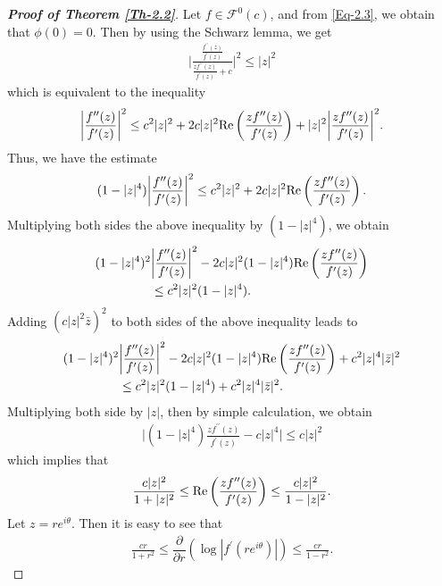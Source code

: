 \documentclass[a4paper,12pt]{amsart}
\theoremstyle{plain}
\theoremstyle{definition}
\theoremstyle{plain}
\begin{document}
\begin{proof}[\bf Proof of Theorem \ref{Th-2.2}]
	Let $f\in\mathcal{F}^0(c)$, and from \eqref{Eq-2.3}, we obtain that $\phi(0)=0$. Then  by using the Schwarz lemma, we get
	\begin{align*}
		\bigg|\frac{\frac{f^{\prime\prime}(z)}{f^{\prime}(z)}}{\frac{zf^{\prime\prime}(z)}{f^{\prime}(z)}+c}\bigg|^2\leq|z|^2
	\end{align*}
	which is equivalent to the inequality
	\begin{align*}
		\bigg|\frac{f^{\prime\prime}(z)}{f^{\prime}(z)}\bigg|^2\leq c^2|z|^2+2c|z|^2{\rm Re}\left(\frac{zf^{\prime\prime}(z)}{f^{\prime}(z)}\right)+|z|^2\bigg|\frac{zf^{\prime\prime}(z)}{f^{\prime}(z)}\bigg|^2.
	\end{align*}
	Thus, we have the estimate
	\begin{align}
		(1-|z|^4)\bigg|\frac{f^{\prime\prime}(z)}{f^{\prime}(z)}\bigg|^2\leq c^2|z|^2+2c|z|^2{\rm Re}\left(\frac{zf^{\prime\prime}(z)}{f^{\prime}(z)}\right).
	\end{align}
	Multiplying both sides the above inequality by $(1-|z|^4)$, we obtain 
	\begin{align*}
		(1-|z|^4)^2&\bigg|\frac{f^{\prime\prime}(z)}{f^{\prime}(z)}\bigg|^2-2c|z|^2(1-|z|^4){\rm Re}\left(\frac{zf^{\prime\prime}(z)}{f^{\prime}(z)}\right)\\&\leq c^2|z|^2(1-|z|^4).
	\end{align*}
	Adding \( \left(c|z|^2 \bar{z} \right)^2 \) to both sides of the above inequality leads to
	\begin{align*}
		(1-|z|^4)^2&\bigg|\frac{f^{\prime\prime}(z)}{f^{\prime}(z)}\bigg|^2-2c|z|^2(1-|z|^4){\rm Re}\left(\frac{zf^{\prime\prime}(z)}{f^{\prime}(z)}\right)+c^2|z|^4|\bar{z}|^2\\&\leq c^2|z|^2(1-|z|^4)+c^2|z|^4|\bar{z}|^2\nonumber.
	\end{align*}
	Multiplying both side by $|z|$, then by simple calculation, we obtain
	\begin{align*}
		\bigg|(1-|z|^4)\frac{zf^{\prime\prime}(z)}{f^{\prime}(z)}-c|z|^4\bigg|\leq c|z|^2
	\end{align*}
	which implies that
	\begin{align*}
		\frac{c|z|^2}{1+|z|^2}\leq{\rm Re}\left(\frac{zf^{\prime\prime}(z)}{f^{\prime}(z)}\right)\leq\frac{c|z|^2}{1-|z|^2}.
	\end{align*}
	Let $z=re^{i\theta}$. Then it is easy to see that
	\begin{align*}
		\frac{c r}{1+r^2}\leq\dfrac{\partial}{\partial r}\left(\log|f^{\prime}(re^{i\theta})|\right)\leq\frac{c r}{1-r^2}.

\end{align*}
\end{proof}
\end{document}

